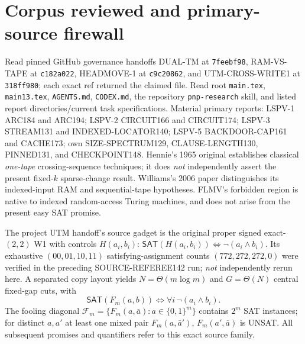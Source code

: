 \documentclass[11pt]{article}
\newcommand{\SAT}{\mathsf{SAT}}
\begin{document}
\section{Corpus reviewed and primary-source firewall}
Read pinned GitHub governance handoffs DUAL-TM at
\texttt{7feebf98}, RAM-VS-TAPE at \texttt{c182a022},
HEADMOVE-1 at \texttt{c9c20862}, and UTM-CROSS-WRITE1 at
\texttt{318ff980}; each exact ref returned the claimed file. Read root
\texttt{main.tex}, \texttt{main13.tex}, \texttt{AGENTS.md},
\texttt{CODEX.md}, the repository \texttt{pnp-research} skill,
and listed report directories/current task specifications.
Material primary reports: LSPV-1 ARC184 and ARC194;
LSPV-2 CIRCUIT166 and CIRCUIT174;
LSPV-3 STREAM131 and INDEXED-LOCATOR140;
LSPV-5 BACKDOOR-CAP161 and CACHE173;
own SIZE-SPECTRUM129, CLAUSE-LENGTH130, PINNED131,
and CHECKPOINT148. Hennie's 1965 original establishes classical
\emph{one-tape} crossing-sequence techniques; it does \emph{not}
independently assert the present fixed-$k$ sparse-change result.
Williams's 2006 paper distinguishes its indexed-input RAM and
sequential-tape hypotheses. FLMV's forbidden region is native to
indexed random-access Turing machines, and does not arise from
the present easy SAT promise. \cite{hennie,williams,flmv}

The project UTM handoff's source gadget is the original proper
signed exact-$(2,2)$ W1 with controls $H(a_i,b_i)$:
$\SAT(H(a_i,b_i))\Leftrightarrow\neg(a_i\wedge b_i)$.
Its exhaustive $(00,01,10,11)$ satisfying-assignment counts
$(772,272,272,0)$ were verified in the preceding SOURCE-REFEREE142
run; \emph{not} independently rerun here.
A separated copy layout yields $N=\Theta(m\log m)$ and
$G=\Theta(N)$ central fixed-gap cuts, with
\[
  \SAT(F_m(a,b))\iff\forall i\,\neg(a_i\wedge b_i).
  \tag{1}
\]
The fooling diagonal $\mathcal F_m=\{F_m(a,\bar a):a\in\{0,1\}^m\}$
contains $2^m$ SAT instances; for distinct $a,a'$ at least one
mixed pair $F_m(a,\bar a')$, $F_m(a',\bar a)$ is UNSAT.
All subsequent promises and quantifiers refer to this exact source family.
\end{document}
